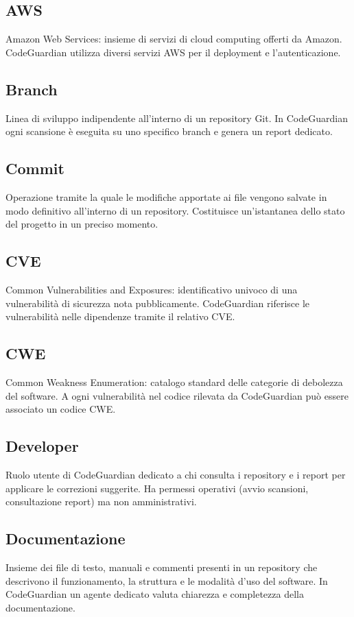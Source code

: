 \documentclass[a4paper, 11pt]{article}
\begin{document}
\subsection{AWS}
Amazon Web Services: insieme di servizi di cloud computing offerti da Amazon. CodeGuardian utilizza diversi servizi AWS per il deployment e l'autenticazione.

\subsection{Branch}
Linea di sviluppo indipendente all'interno di un repository Git. In CodeGuardian ogni scansione è eseguita su uno specifico branch e genera un report dedicato.

\subsection{Commit}
Operazione tramite la quale le modifiche apportate ai file vengono salvate in modo definitivo all'interno di un repository. Costituisce un'istantanea dello stato del progetto in un preciso momento.

\subsection{CVE}
Common Vulnerabilities and Exposures: identificativo univoco di una vulnerabilità di sicurezza nota pubblicamente. CodeGuardian riferisce le vulnerabilità nelle dipendenze tramite il relativo CVE.

\subsection{CWE}
Common Weakness Enumeration: catalogo standard delle categorie di debolezza del software. A ogni vulnerabilità nel codice rilevata da CodeGuardian può essere associato un codice CWE.

\subsection{Developer}
Ruolo utente di CodeGuardian dedicato a chi consulta i repository e i report per applicare le correzioni suggerite. Ha permessi operativi (avvio scansioni, consultazione report) ma non amministrativi.

\subsection{Documentazione}
Insieme dei file di testo, manuali e commenti presenti in un repository che descrivono il funzionamento, la struttura e le modalità d'uso del software. In CodeGuardian un agente dedicato valuta chiarezza e completezza della documentazione.
\end{document}
